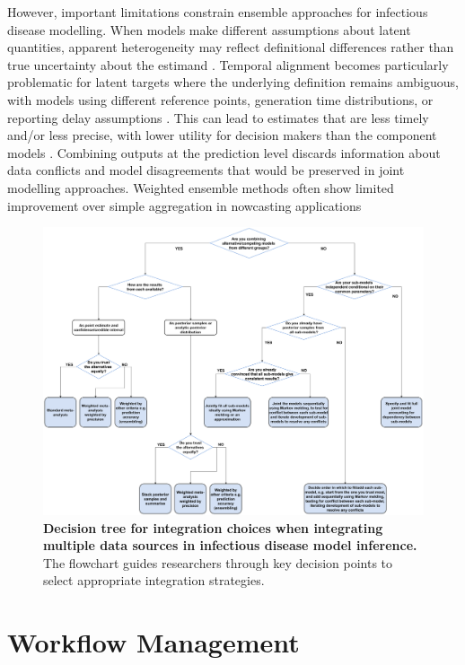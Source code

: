 \documentclass{article}
\begin{document}
However, important limitations constrain ensemble approaches for infectious disease modelling.
When models make different assumptions about latent quantities, apparent heterogeneity may reflect definitional differences rather than true uncertainty about the estimand \citep{brockhaus2023why}.
Temporal alignment becomes particularly problematic for latent targets where the underlying definition remains ambiguous, with models using different reference points, generation time distributions, or reporting delay assumptions \citep{brockhaus2023why}.
This can lead to estimates that are less timely and/or less precise, with lower utility for decision makers than the component models \citep{manley2024combining}.
Combining outputs at the prediction level discards information about data conflicts and model disagreements that would be preserved in joint modelling approaches.
Weighted ensemble methods often show limited improvement over simple aggregation in nowcasting applications \citep{sherratt2021exploring}

\begin{figure}[htbp]
    \centering
    \includegraphics[width=\textwidth]{figures/integration choices decision tree.drawio.pdf}
    \caption{\textbf{Decision tree for integration choices when integrating multiple data sources in infectious disease model inference.} The flowchart guides researchers through key decision points to select appropriate integration strategies.}
    \label{fig:integration}
\end{figure}

\section{Workflow Management}
\end{document}
